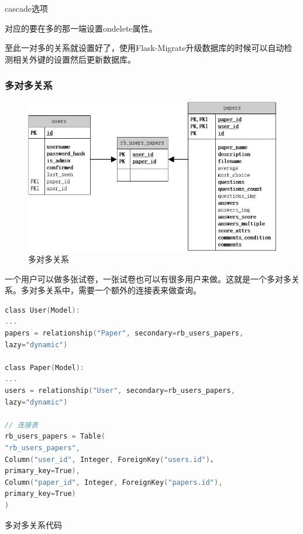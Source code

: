 \begin{center}
	{\small cascade选项}
\end{center}

对应的要在多的那一端设置ondelete属性。

至此一对多的关系就设置好了，使用Flask-Migrate升级数据库的时候可以自动检测相关外键的设置然后更新数据库。

\subsubsection{多对多关系}

\begin{figure}[thbp!]
	\centering
	\includegraphics[width=1.0\linewidth]{figure/rb_users_papers}
	\caption{多对多关系}
	\label{fig:rb_users_papers}
\end{figure}

一个用户可以做多张试卷，一张试卷也可以有很多用户来做。这就是一个多对多关系。多对多关系中，需要一个额外的连接表来做查询。

\begin{lstlisting}[language=C]
class User(Model):
...
papers = relationship("Paper", secondary=rb_users_papers,
lazy="dynamic")

class Paper(Model):
...
users = relationship("User", secondary=rb_users_papers,
lazy="dynamic")

// 连接表
rb_users_papers = Table(
"rb_users_papers",
Column("user_id", Integer, ForeignKey("users.id")，
primary_key=True),
Column("paper_id", Integer, ForeignKey("papers.id"),
primary_key=True)
)
\end{lstlisting}

\begin{center}
	{\small 多对多关系代码}
\end{center}

